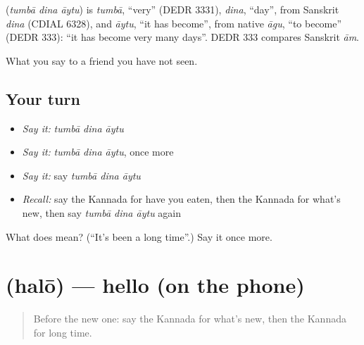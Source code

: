 \begin{cousinweb}
\textbf{  } (\emph{tumbā dina āytu}) is \emph{tumbā}, \textquotedblleft{}very\textquotedblright{} (DEDR 3331), \emph{dina}, \textquotedblleft{}day\textquotedblright{}, from Sanskrit \emph{dina} (CDIAL 6328), and \emph{āytu}, \textquotedblleft{}it has become\textquotedblright{}, from native \emph{āgu}, \textquotedblleft{}to become\textquotedblright{} (DEDR 333): \textquotedblleft{}it has become very many days\textquotedblright{}. DEDR 333 compares Sanskrit \emph{ām}.
\end{cousinweb}

\begin{grammarlens}[title={What you've built}]
What you say to a friend you have not seen.
\end{grammarlens}

\subsection*{Your turn}
\begin{itemize}
\raggedright
  \item \emph{Say it:} \emph{tumbā dina āytu}
  \item \emph{Say it:} \emph{tumbā dina āytu}, once more
  \item \emph{Say it:} say \emph{tumbā dina āytu}
  \item \emph{Recall:} say the Kannada for have you eaten, then the Kannada for what's new, then say \emph{tumbā dina āytu} again
\end{itemize}

\begin{tcolorbox}[breakable,colback=teal!4,colframe=teal!35!black,title={Before you move on}]
What does    mean? (\textquotedblleft{}It's been a long time\textquotedblright{}.) Say it once more.
\end{tcolorbox}
\section[\texorpdfstring{\kn{ಹಲೋ} (halō)}{ಹಲೋ (halō)}]{ (halō) — hello (on the phone)}

\label{lesson:KA-C96-hello}



\begin{quote}
Before the new one: say the Kannada for what's new, then the Kannada for long time.
\end{quote}

